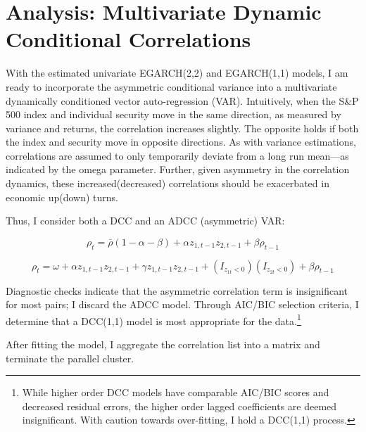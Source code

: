 \documentclass[]{elsarticle} %
\begin{document}
\section{Analysis: Multivariate Dynamic Conditional
Correlations}\label{analysis-multivariate-dynamic-conditional-correlations}

With the estimated univariate EGARCH(2,2) and EGARCH(1,1) models, I am
ready to incorporate the asymmetric conditional variance into a
multivariate dynamically conditioned vector auto-regression (VAR).
Intuitively, when the S\&P 500 index and individual security move in the
same direction, as measured by variance and returns, the correlation
increases slightly. The opposite holds if both the index and security
move in opposite directions. As with variance estimations, correlations
are assumed to only temporarily deviate from a long run mean---as
indicated by the omega parameter. Further, given asymmetry in the
correlation dynamics, these increased(decreased) correlations should be
exacerbated in economic up(down) turns.

Thus, I consider both a DCC and an ADCC (asymmetric) VAR:

\[\rho_{t} = \bar\rho(1-\alpha-\beta)+\alpha z_{1,t-1}z_{2,t-1} + \beta\rho_{t-1}\]

\[\rho_{t} = \omega + \alpha z_{1,t-1}z_{2,t-1} + \gamma z_{1,t-1}z_{2,t-1}+(I_{z_{1t}<0})(I_{z_{2t}<0})+\beta\rho_{t-1}\]

Diagnostic checks indicate that the asymmetric correlation term is
insignificant for most pairs; I discard the ADCC model. Through AIC/BIC
selection criteria, I determine that a DCC(1,1) model is most
appropriate for the data.\footnote{While higher order DCC models have
  comparable AIC/BIC scores and decreased residual errors, the higher
  order lagged coefficients are deemed insignificant. With caution
  towards over-fitting, I hold a DCC(1,1) process.}

After fitting the model, I aggregate the correlation list into a matrix
and terminate the parallel cluster.
\end{document}
